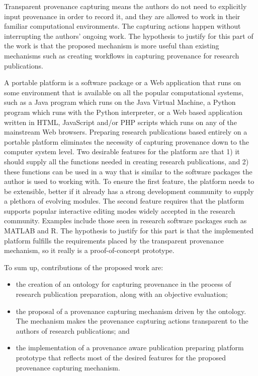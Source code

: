 Transparent provenance capturing means the authors do not need to explicitly input provenance in order to record it, and they are allowed to work in their familiar computational environments. The capturing actions happen without interrupting the authors' ongoing work. The hypothesis to justify for this part of the work is that the proposed mechanism is more useful than existing mechanisms such as creating workflows in capturing provenance for research publications.

A portable platform is a software package or a Web application that runs on some environment that is available on all the popular computational systems, such as a Java program which runs on the Java Virtual Machine, a Python program which runs with the Python interpreter, or a Web based application written in HTML, JavaScript and/or PHP scripts which runs on any of the mainstream Web browsers. Preparing research publications based entirely on a portable platform eliminates the necessity of capturing provenance down to the computer system level. Two desirable features for the platform are that 1) it should supply all the functions needed in creating research publications, and 2) these functions can be used in a way that is similar to the software packages the author is used to working with. To ensure the first feature, the platform needs to be extensible, better if it already has a strong development community to supply a plethora of evolving modules. The second feature requires that the platform supports popular interactive editing modes widely accepted in the research community. Examples include those seen in research software packages such as MATLAB and R. The hypothesis to justify for this part is that the implemented platform fulfills the requirements placed by the transparent provenance mechanism, so it really is a proof-of-concept prototype. 

To sum up, contributions of the proposed work are:
\begin{itemize}
\item the creation of an ontology for capturing provenance in the process of research publication preparation, along with an objective evaluation;
\item the proposal of a provenance capturing mechanism driven by the ontology. The mechanism makes the provenance capturing actions transparent to the authors of research publications; and 
\item the implementation of a provenance aware publication preparing platform prototype that reflects most of the desired features for the proposed provenance capturing mechanism.
\end{itemize}

